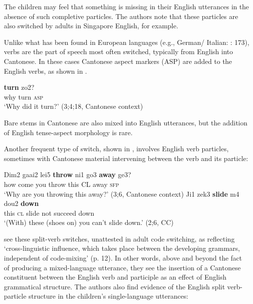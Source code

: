 \documentclass[output=paper]{langscibook}
\begin{document}
The children may feel that something is missing in their English utterances in the absence of such completive particles. The authors note that these particles are also switched by adults in Singapore English, for example.

Unlike what has been found in European languages (e.g., German/ Italian: \citealt{Cantone2007}: 173), verbs are the part of speech most often switched, typically from English into Cantonese. In these cases Cantonese aspect markers (ASP) are added to the English verbs, as shown in .

\ea%
    \label{ex:vihmannvihmann:5}
 \textbf{{turn}} {zo2?}\\
why              turn   \textsc{asp}\\
\glt `Why did it turn?' (3;4;18, Cantonese context)
    \z

Bare stems in Cantonese are also mixed into English utterances, but the addition of English tense-aspect morphology is rare.

Another frequent type of switch, shown in , involves English verb particles, sometimes with Cantonese material intervening between the verb and its particle:

\ea%
    \label{ex:vihmannvihmann:6}
\ea
\gll   Dim2   gaai2   lei5 \textbf{{throw}} ni1   go3 \textbf{{away}} {ge3?}\\
how   come   you   throw   this   CL\footnotemark{}    away \textsc{sfp}\\
\glt  `Why are you throwing this away?' (3;6, Cantonese context)
\ex
\gll Ji1   zek3 \textbf{{slide}} m4   dou2 \textbf{{down}}\\
this   \textsc{cl}  slide   not   succeed   down\\
\glt `(With) these (shoes on) you can’t slide down.' (2;6, CC)
    \z
\z

\citeauthor{YipMatthews2016} see these split-verb switches, unattested in adult code switching, as reflecting ‘cross-linguistic influence, which takes place between the developing grammars, independent of code-mixing’ (p. 12). In other words, above and beyond the fact of producing a mixed-language utterance, they see the insertion of a Cantonese constituent between the English verb and participle as an effect of English grammatical structure. The authors also find evidence of the English split verb-particle structure in the children’s single-language utterances: 
\end{document}
